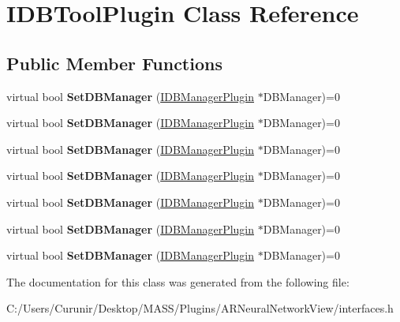 \hypertarget{class_i_d_b_tool_plugin}{}\section{I\+D\+B\+Tool\+Plugin Class Reference}
\label{class_i_d_b_tool_plugin}
\subsection*{Public Member Functions}
\begin{DoxyCompactItemize}
\item 
\mbox{\label{class_i_d_b_tool_plugin_ae7c5693728988f5aa46065fed7a8ca99}} 
virtual bool {\bfseries Set\+D\+B\+Manager} (\hyperlink{class_i_d_b_manager_plugin}{I\+D\+B\+Manager\+Plugin} $\ast$D\+B\+Manager)=0
\item 
\mbox{\label{class_i_d_b_tool_plugin_ae7c5693728988f5aa46065fed7a8ca99}} 
virtual bool {\bfseries Set\+D\+B\+Manager} (\hyperlink{class_i_d_b_manager_plugin}{I\+D\+B\+Manager\+Plugin} $\ast$D\+B\+Manager)=0
\item 
\mbox{\label{class_i_d_b_tool_plugin_ae7c5693728988f5aa46065fed7a8ca99}} 
virtual bool {\bfseries Set\+D\+B\+Manager} (\hyperlink{class_i_d_b_manager_plugin}{I\+D\+B\+Manager\+Plugin} $\ast$D\+B\+Manager)=0
\item 
\mbox{\label{class_i_d_b_tool_plugin_ae7c5693728988f5aa46065fed7a8ca99}} 
virtual bool {\bfseries Set\+D\+B\+Manager} (\hyperlink{class_i_d_b_manager_plugin}{I\+D\+B\+Manager\+Plugin} $\ast$D\+B\+Manager)=0
\item 
\mbox{\label{class_i_d_b_tool_plugin_ae7c5693728988f5aa46065fed7a8ca99}} 
virtual bool {\bfseries Set\+D\+B\+Manager} (\hyperlink{class_i_d_b_manager_plugin}{I\+D\+B\+Manager\+Plugin} $\ast$D\+B\+Manager)=0
\item 
\mbox{\label{class_i_d_b_tool_plugin_ae7c5693728988f5aa46065fed7a8ca99}} 
virtual bool {\bfseries Set\+D\+B\+Manager} (\hyperlink{class_i_d_b_manager_plugin}{I\+D\+B\+Manager\+Plugin} $\ast$D\+B\+Manager)=0
\item 
\mbox{\label{class_i_d_b_tool_plugin_ae7c5693728988f5aa46065fed7a8ca99}} 
virtual bool {\bfseries Set\+D\+B\+Manager} (\hyperlink{class_i_d_b_manager_plugin}{I\+D\+B\+Manager\+Plugin} $\ast$D\+B\+Manager)=0
\end{DoxyCompactItemize}


The documentation for this class was generated from the following file\+:\begin{DoxyCompactItemize}
\item 
C\+:/\+Users/\+Curunir/\+Desktop/\+M\+A\+S\+S/\+Plugins/\+A\+R\+Neural\+Network\+View/interfaces.\+h\end{DoxyCompactItemize}
